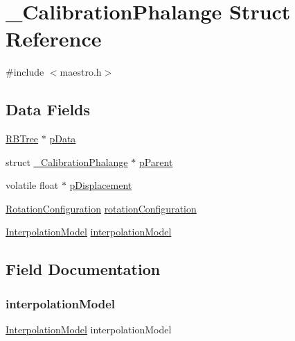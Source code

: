 \hypertarget{struct___calibration_phalange}{}\section{\+\_\+\+Calibration\+Phalange Struct Reference}
\label{struct___calibration_phalange}


{\ttfamily \#include $<$maestro.\+h$>$}

\subsection*{Data Fields}
\begin{DoxyCompactItemize}
\item 
\hyperlink{red__black__tree_8h_ad17494f46b6d6f959a881b1bc3acd99a}{R\+B\+Tree} $\ast$ \hyperlink{struct___calibration_phalange_afb22b797fd80f8a4f6818f7e000a9cdf}{p\+Data}
\item 
struct \hyperlink{struct___calibration_phalange}{\+\_\+\+Calibration\+Phalange} $\ast$ \hyperlink{struct___calibration_phalange_a65e5d98f7da098750ba8cc3acb7ab459}{p\+Parent}
\item 
volatile float $\ast$ \hyperlink{struct___calibration_phalange_ab518a2152d4db86a5e4558427b521b17}{p\+Displacement}
\item 
\hyperlink{struct_rotation_configuration}{Rotation\+Configuration} \hyperlink{struct___calibration_phalange_a9e2edddae0348efcccaf4e8827fbe209}{rotation\+Configuration}
\item 
\hyperlink{struct_interpolation_model}{Interpolation\+Model} \hyperlink{struct___calibration_phalange_aae296cff8baafb2c97a6bb226f85ab82}{interpolation\+Model}
\end{DoxyCompactItemize}


\subsection{Field Documentation}
\mbox{\label{struct___calibration_phalange_aae296cff8baafb2c97a6bb226f85ab82}} 
\subsubsection{\texorpdfstring{interpolation\+Model}{interpolationModel}}
{\footnotesize\ttfamily \hyperlink{struct_interpolation_model}{Interpolation\+Model} interpolation\+Model}

